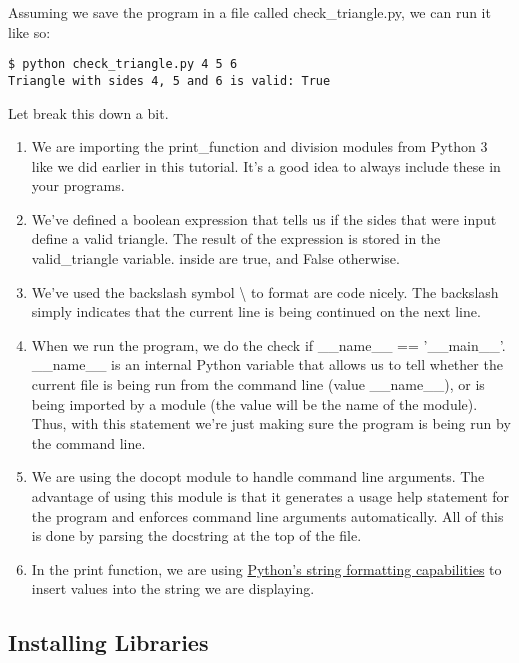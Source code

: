 Assuming we save the program in a file called check\_triangle.py, we can
run it like so:

\begin{verbatim}
$ python check_triangle.py 4 5 6
Triangle with sides 4, 5 and 6 is valid: True
\end{verbatim}

Let break this down a bit.

\begin{enumerate}
\tightlist
\item
  We are importing the print\_function and division modules from Python
  3 like we did earlier in this tutorial. It's a good idea to always
  include these in your programs.
\item
  We've defined a boolean expression that tells us if the sides that
  were input define a valid triangle. The result of the expression is
  stored in the valid\_triangle variable. inside are true, and False
  otherwise.
\item
  We've used the backslash symbol \textbackslash{} to format are code
  nicely. The backslash simply indicates that the current line is being
  continued on the next line.
\item
  When we run the program, we do the check if \_\_name\_\_ ==
  '\_\_main\_\_'. \_\_name\_\_ is an internal Python variable that
  allows us to tell whether the current file is being run from the
  command line (value \_\_name\_\_), or is being imported by a module
  (the value will be the name of the module). Thus, with this statement
  we're just making sure the program is being run by the command line.
\item
  We are using the docopt module to handle command line arguments. The
  advantage of using this module is that it generates a usage help
  statement for the program and enforces command line arguments
  automatically. All of this is done by parsing the docstring at the top
  of the file.
\item
  In the print function, we are using
  \href{https://docs.python.org/2/library/string.html\#format-string-syntax}{Python's
  string formatting capabilities} to insert values into the string we
  are displaying.
\end{enumerate}

\subsection{Installing Libraries}\label{installing-libraries}

